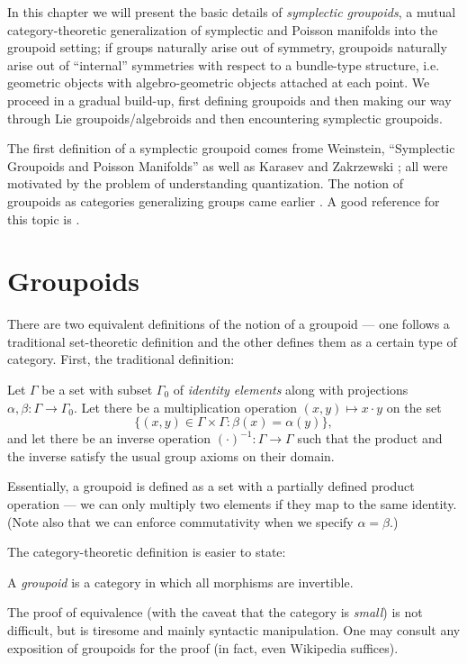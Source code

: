 In this chapter we will present the basic details of \emph{symplectic groupoids}, a mutual category-theoretic generalization of symplectic and Poisson manifolds into the groupoid setting; if groups naturally arise out of symmetry, groupoids naturally arise out of ``internal'' symmetries with respect to a bundle-type structure, i.e. geometric objects with algebro-geometric objects attached at each point. We proceed in a gradual build-up, first defining groupoids and then making our way through Lie groupoids/algebroids and then encountering symplectic groupoids.

The first definition of a symplectic groupoid comes frome Weinstein, ``Symplectic Groupoids and Poisson Manifolds'' \cite{weinstein87} as well as Karasev \cite{} and Zakrzewski \cite{}; all were motivated by the problem of understanding quantization. The notion of groupoids as categories generalizing groups came earlier \cite{SOMETHING HERE}. A good reference for this topic is \cite{}. %

\section{Groupoids}
There are two equivalent definitions of the notion of a groupoid --- one follows a traditional set-theoretic definition and the other defines them as a certain type of category. First, the traditional definition:

\begin{defn}
Let $\Gamma$ be a set with subset $\Gamma_0$ of \emph{identity elements} along with projections $\alpha, \beta: \Gamma \to \Gamma_0$. Let there be a multiplication operation $(x,y) \mapsto x \cdot y$ on the set
$$
\{(x,y) \in \Gamma \times \Gamma : \beta(x) = \alpha(y)\},
$$
and let there be an inverse operation $(\cdot)^{-1}: \Gamma \to \Gamma$ such that the product and the inverse satisfy the usual group axioms on their domain.
\end{defn}
Essentially, a groupoid is defined as a set with a partially defined product operation --- we can only multiply two elements if they map to the same identity. (Note also that we can enforce commutativity when we specify $\alpha = \beta$.)

The category-theoretic definition is easier to state:
\begin{defn}
A \emph{groupoid} is a category in which all morphisms are invertible.
\end{defn}
The proof of equivalence (with the caveat that the category is \emph{small}) is not difficult, but is tiresome and mainly syntactic manipulation. One may consult any exposition of groupoids for the proof (in fact, even Wikipedia suffices).

